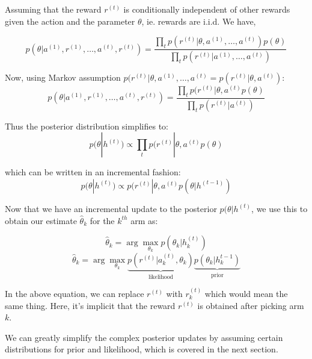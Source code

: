 \documentclass[11pt]{article}
\begin{document}
Assuming that the reward $r^{(t)}$ is conditionally independent of other rewards given the action and the parameter $\theta$, ie. rewards are i.i.d. We have,

$$p(\theta | a^{(1)}, r^{(1)}, \dots, a^{(t)}, r^{(t)}) = \frac{\prod_t  p(r^{(t)} | \theta, a^{(1)}, \dots, a^{(t)})p(\theta)}{\prod_t p(r^{(t)} | a^{(1)}, \dots, a^{(t)})}$$ 

Now, using Markov assumption $p(r^{(t)} | \theta, a^{(1)}, \dots, a^{(t)} = p(r^{(t)} | \theta, a^{(t)})$:
$$p(\theta | a^{(1)}, r^{(1)}, \dots, a^{(t)}, r^{(t)}) = \frac{\prod_t  p(r^{(t)} | \theta, a^{(t)}p(\theta)}{\prod_t p(r^{(t)} | a^{(t)})}$$ 

Thus the posterior distribution simplifies to:
$$p(\theta | h^{(t)}) \propto \prod_t  p(r^{(t)} | \theta, a^{(t)}p(\theta)$$ 

which can be written in an incremental fashion:
$$p(\theta | h^{(t)}) \propto p(r^{(t)} | \theta, a^{(t)}p(\theta|h^{(t-1)})$$

Now that we have an incremental update to the posterior $p(\theta|h^{(t)}$, we use this to obtain our estimate $\hat{\theta}_k$ for the $k^{th}$ arm as:

$$\hat{\theta}_k = \arg \max_{\theta_k} p(\theta_k | h_k^{(t)})$$
$$\hat{\theta}_k = \arg \max_{\theta_k} \underbrace{p(r^{(t)} | a_k^{(t)}, \theta_k)}_{\text{likelihood}}\underbrace{p(\theta_k|h_k^{t-1})}_{\text{prior}}$$

In the above equation, we can replace $r^{(t)}$ with $r^{(t)}_k$ which would mean the same thing. Here, it's implicit that the reward $r^{(t)}$ is obtained after picking arm $k$.

We can greatly simplify the complex posterior updates by assuming certain distributions for prior and likelihood, which is covered in the next section.
\end{document}
